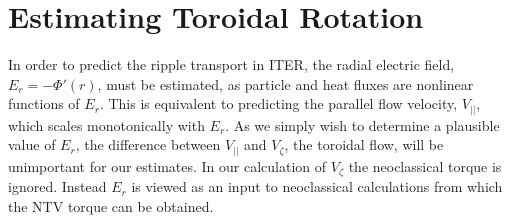 \documentclass[aip, pop, preprint]{revtex4-1}
\numberwithin{figure}{section}
\numberwithin{equation}{section}
\begin{document}
\FloatBarrier

\section{Estimating Toroidal Rotation}\label{rotation}

In order to predict the ripple transport in ITER, the radial electric field, $E_r = - \Phi'(r) $, must be estimated, as particle and heat fluxes are nonlinear functions of $E_r$. This is equivalent to predicting the parallel flow velocity, $V_{||}$, which scales monotonically with $E_r$.  As we simply wish to determine a plausible value of $E_r$, the difference between $V_{||}$ and $V_{\zeta}$, the toroidal flow, will be unimportant for our estimates. In our calculation of $V_{\zeta}$ the neoclassical torque is ignored. Instead $E_r$ is viewed as an input to neoclassical calculations from which the NTV torque can be obtained. 
\end{document}
